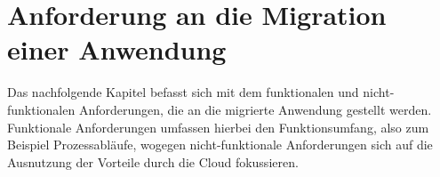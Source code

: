 \chapter{Anforderung an die Migration einer Anwendung}
\label{chap:anforderungen}

Das nachfolgende Kapitel befasst sich mit dem funktionalen und nicht-funktionalen Anforderungen, die an die migrierte Anwendung gestellt werden. Funktionale Anforderungen umfassen hierbei den Funktionsumfang, also zum Beispiel Prozessabläufe, wogegen nicht-funktionale Anforderungen sich auf die Ausnutzung der Vorteile durch die Cloud fokussieren.


